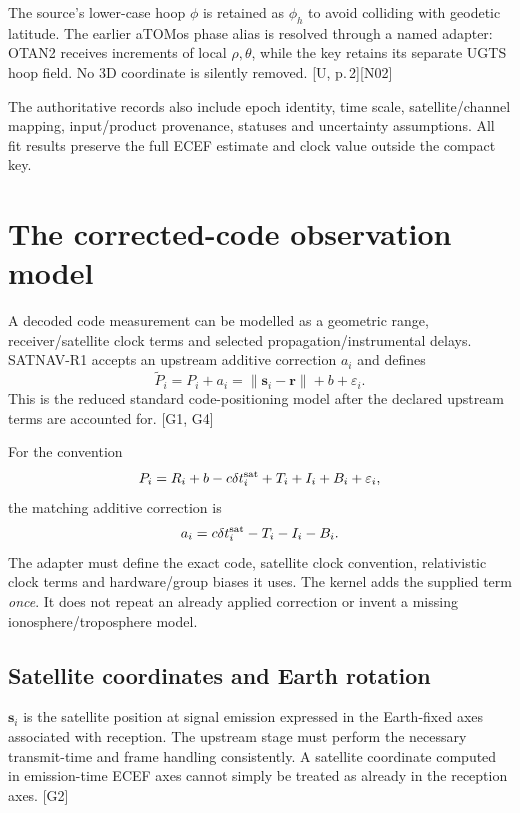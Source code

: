\documentclass[11pt,a4paper]{article}
\newcommand{\src}[1]{\textcolor{muted}{[U, #1]}}
\newcommand{\ext}[1]{\textcolor{muted}{[#1]}}
\newcommand{\dec}[1]{\textcolor{accent}{[N#1]}}
\begin{document}
The source's lower-case hoop $\phi$ is retained as $\phi_h$ to avoid colliding with
geodetic latitude. The earlier aTOMos phase alias is resolved through a named adapter:
OTAN2 receives increments of local $\rho,\theta$, while the key retains its separate
UGTS hoop field. No 3D coordinate is silently removed. \src{p.\,2}\dec{02}

The authoritative records also include epoch identity, time scale, satellite/channel
mapping, input/product provenance, statuses and uncertainty assumptions. All fit
results preserve the full ECEF estimate and clock value outside the compact key.
\clearpage

\section{The corrected-code observation model}
A decoded code measurement can be modelled as a geometric range, receiver/satellite
clock terms and selected propagation/instrumental delays. SATNAV-R1 accepts an
upstream additive correction $a_i$ and defines
\begin{equation}
\widetilde P_i=P_i+a_i=\|\boldsymbol s_i-\boldsymbol r\|+b+\varepsilon_i.
\end{equation}
This is the reduced standard code-positioning model after the declared upstream
terms are accounted for. \ext{G1, G4}

For the convention
\begin{equation}
P_i=R_i+b-c\delta t_i^{\rm sat}+T_i+I_i+B_i+\varepsilon_i,
\end{equation}
the matching additive correction is
\begin{equation}
a_i=c\delta t_i^{\rm sat}-T_i-I_i-B_i.
\end{equation}
The adapter must define the exact code, satellite clock convention, relativistic
clock terms and hardware/group biases it uses. The kernel adds the supplied term
\emph{once}. It does not repeat an already applied correction or invent a missing
ionosphere/troposphere model.

\subsection{Satellite coordinates and Earth rotation}
$\boldsymbol s_i$ is the satellite position at signal emission expressed in the
Earth-fixed axes associated with reception. The upstream stage must perform the
necessary transmit-time and frame handling consistently. A satellite coordinate
computed in emission-time ECEF axes cannot simply be treated as already in the
reception axes. \ext{G2}
\end{document}
